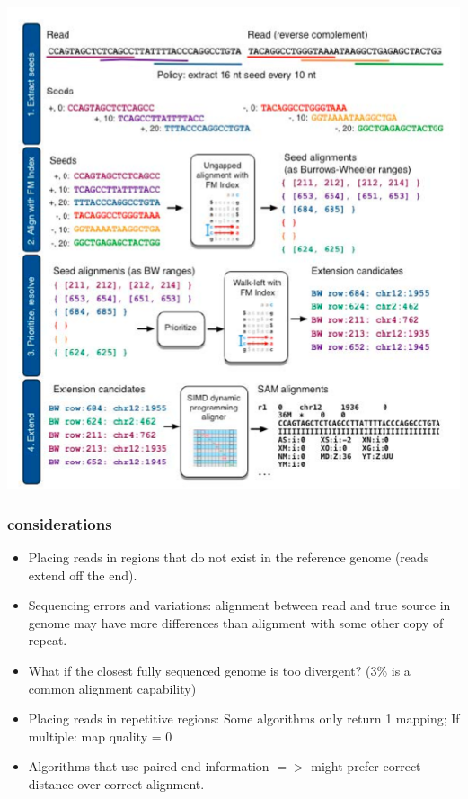 \documentclass[pdf]{beamer}
\begin{document}
\begin{frame}
\begin{center}
\includegraphics[scale=.35]{Figures/BWT.png} 
\end{center}
\end{frame}

\begin{frame}
\frametitle{considerations}
\begin{itemize}
\item Placing reads in regions that do not exist in the reference genome (reads extend off the end).
\item Sequencing errors and variations: alignment between read and true source in genome may have more differences than alignment with some other copy of repeat.
\item What if the closest fully sequenced genome is too divergent? (3\% is a common alignment capability)
\item Placing reads in repetitive regions: Some algorithms only return 1 mapping; If multiple: map quality = 0
\item Algorithms that use paired-end information $=>$ might prefer correct distance over correct alignment.
\end{itemize}
\end{frame}
\end{document}
